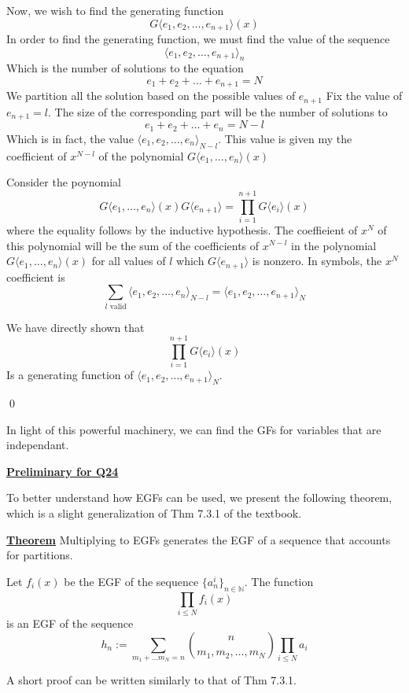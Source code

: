 \documentclass{article}
\newcommand{\new}[1]{
    \vspace{2mm}
    \noindent
    \textbf{
    \underline{#1}}
}
\begin{document}
Now, we wish to find the generating function 
\[
    G\langle
        e_1, e_2, \dots, e_{n+ 1}
    \rangle(x)
\]
In order to find the generating function, we 
must find the value of the sequence 
\[
    \langle
        e_1, e_2, \dots, e_{n+ 1}
    \rangle_n
\]
Which is the number of solutions to the equation 
\[
     e_1 + e_2+ \dots+ e_{n+ 1} = N
\]
We partition all the solution based on the 
possible values of $e_{n + 1}$
Fix the value of $e_{n + 1} = l$. The size of the 
corresponding part will be the number of solutions 
to 
\[
     e_1 + e_2+ \dots+ e_n = N - l
\]
Which is in fact, the value 
$
    \langle 
        e_1, e_2 , \dots, e_n
    \rangle _{N - l}
$. This value is given my the coefficient of 
$x^{N - l}$ of the polynomial 
$G\langle e_1 , \dots, e_n \rangle(x)$

Consider the poynomial 
\[
    G\langle e_1 , \dots, e_n \rangle(x)
    G\langle e_{n + 1} \rangle
    = 
    \prod_{i = 1}^{n + 1} 
    G\langle e_i \rangle(x)
\]where the equality follows by the inductive hypothesis. 
The coeffieient of $x^{N}$ of this polynomial 
will be the sum of the coefficients of $x^{N - l}$
in the polynomial $G\langle e_1 , \dots, e_n \rangle(x)$ 
for all values of $l$ which $G\langle e_{n+1}\rangle$
is nonzero. In symbols, the $x^N$ coefficient is 
\[
   \sum_{l \textrm{ valid}}
    \langle 
        e_1, e_2 , \dots, e_n
    \rangle _{N - l}
    = \langle 
        e_1, e_2 , \dots, e_{n + 1}
    \rangle _{N}
\]

We have directly shown that 
\[
    \prod_{i = 1}^{n + 1} 
    G\langle e_i \rangle(x)
\]
Is a generating function of $\langle 
        e_1, e_2 , \dots, e_{n + 1}
    \rangle _{N}$. 
    
    \hfill \qed

In light of this powerful machinery, we can find the 
GFs for variables that are independant. 


\new{Preliminary for Q24}
To better understand how EGFs can be used, we present 
the following theorem, which is a slight generalization 
of Thm 7.3.1 of the textbook. 

\new{Theorem} Multiplying to EGFs generates the EGF 
of a sequence that accounts for partitions. 

Let $f_i(x)$ be the EGF of the sequence $\{a^i_n\}_{n \in \mathbb{N}}$. 
The function 
\[
    \prod_{i \leq N} f_i(x)
\]
is an EGF of the sequence 
\[
    h_n := \sum_{m_1 + \dots m_N = n}\binom{n}{m_1, m_2, \dots, m_N}
    \prod_{i \leq N} a_i
\]

A short proof can be written similarly to that of Thm 7.3.1. 
\end{document}
